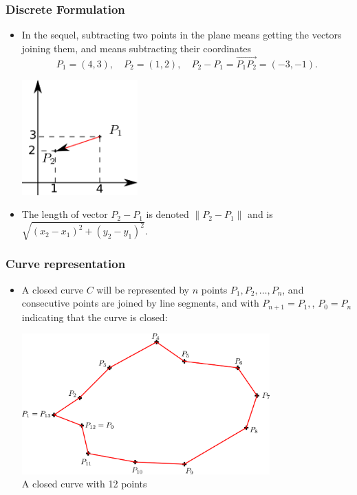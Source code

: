 \documentclass[10pt]{beamer}
\begin{document}
\begin{frame}
  \frametitle{Discrete Formulation}
  \begin{itemize}
  \item In the sequel, subtracting two points in the plane means getting the vectors joining them, and means subtracting
    their coordinates
    $$
    P_1 = (4,3),\quad P_2 = (1,2),\quad P_2-P_1 = \overrightarrow{P_1P_2} = (-3,-1). 
    $$
    \begin{center}
      \includegraphics[width=0.35\textwidth]{FIGURES/diffpoints}
    \end{center}
  \item The length of vector $P_2-P_1$ is denoted $\|P_2-P_1\|$ and is $\sqrt{(x_2-x_1)^2 + (y_2-y_1)^2}$.
  \end{itemize}
\end{frame}


\begin{frame}
  \frametitle{Curve representation}
  \begin{itemize}
  \item A closed curve $C$ will be represented by $n$ points $P_1,P_2,\dots,P_n$, and consecutive points are joined
    by line segments, and with $P_{n+1} = P_1,$, $P_0=P_n$ indicating that the curve is closed: 
    \begin{center}
      \includegraphics[width=0.75\textwidth]{FIGURES/closedcurvepoints}\\
      A closed curve with 12 points
    \end{center}
  \end{itemize}
\end{frame}
\end{document}
